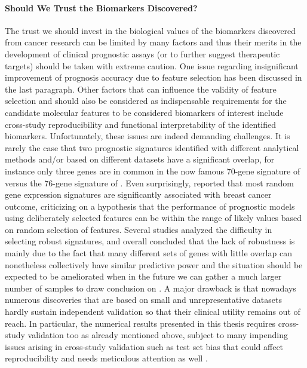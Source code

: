 \paragraph{Should We Trust the Biomarkers Discovered?} The trust we should invest in the biological values of the biomarkers discovered from cancer research can be limited by many factors and thus their merits in the development of clinical prognostic assays (or to further suggest therapeutic targets) should be taken with extreme caution. One issue regarding insignificant improvement of prognosis accuracy due to feature selection has been discussed in the last paragraph. Other factors that can influence the validity of feature selection and should also be considered as indispensable requirements for the candidate molecular features to be considered biomarkers of interest include cross-study reproducibility and functional interpretability of the identified biomarkers. Unfortunately, these issues are indeed demanding challenges. It is rarely the case that two prognostic signatures identified with different analytical methods and/or based on different datasets have a significant overlap, for instance only three genes are in common in the now famous 70-gene signature of \cite{Veer2002Gene} versus the 76-gene signature of \cite{Wang2005Gene}. Even surprisingly, \cite{Venet2011Most} reported that most random gene expression signatures are significantly associated with breast cancer outcome, criticizing on a hypothesis that the performance of prognostic models using deliberately selected features can be within the range of likely values based on random selection of features. Several studies analyzed the difficulty in selecting robust signatures, and overall concluded that the lack of robustness is mainly due to the fact that many different sets of genes with little overlap can nonetheless collectively have similar predictive power and the situation should be expected to be ameliorated when in the future we can gather a much larger number of samples to draw conclusion on \cite{Michiels2005Prediction, Ein-Dor2006Thousands, Haury2011influence}. A major drawback is that nowadays numerous discoveries that are based on small and unrepresentative datasets hardly sustain independent validation so that their clinical utility remains out of reach. In particular, the numerical results presented in this thesis requires cross-study validation too as already mentioned above, subject to many impending issues arising in cross-study validation such as test set bias that could affect reproducibility and needs meticulous attention as well \cite{Patil2015Test}.


